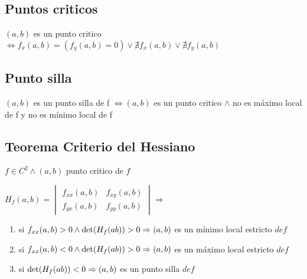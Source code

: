 \documentclass[../practica_06.tex]{subfiles}
\begin{document}
    \subsection*{Puntos criticos}

        $(a,b)$ es un punto critico $\Leftrightarrow f_x(a,b) = (f_y(a,b) = 0) \vee \nexists f_x(a,b) \vee \nexists f_y(a,b)$ 

    \subsection*{Punto silla}

        $(a,b)$ es un punto silla de f $\Leftrightarrow (a,b)$ es un punto critico $\wedge$ no es máximo local de f y no es mínimo local de f

    \subsection*{Teorema Criterio del Hessiano}

        $f \in C^2 \wedge (a,b)$ punto critico de $f$

        $H_f(a,b) = \begin{vmatrix}
            f_{xx}(a,b) & f_{xy}(a,b) \\
            f_{yx}(a,b) & f_{yy}(a,b)
        \end{vmatrix} \Rightarrow$

        \begin{enumerate}
            \item si $f_{xx}(a,b) > 0 \wedge \determinant(H_f(ab))>0 \Rightarrow (a,b)$ es un mínimo local estricto $ de f$
            \item si $f_{xx}(a,b) < 0 \wedge \determinant(H_f(ab))>0 \Rightarrow (a,b)$ es un máximo local estricto $ de f$
            \item si $\determinant(H_f(ab))<0 \Rightarrow (a,b)$ es un punto silla $ de f$
        \end{enumerate}
\end{document}
